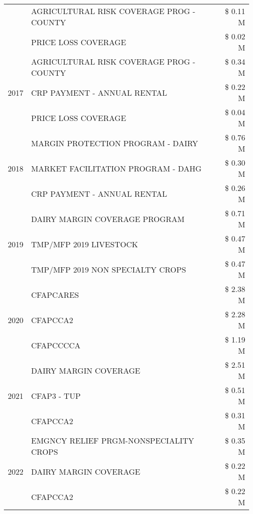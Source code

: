 \begin{tabular}{llr}
 & AGRICULTURAL RISK COVERAGE PROG - COUNTY & \$ 0.11 M \\
 & PRICE LOSS COVERAGE & \$ 0.02 M \\
\cline{1-3}
\multirow[t]{3}{*}{2017} & AGRICULTURAL RISK COVERAGE PROG - COUNTY & \$ 0.34 M \\
 & CRP PAYMENT - ANNUAL RENTAL & \$ 0.22 M \\
 & PRICE LOSS COVERAGE & \$ 0.04 M \\
\cline{1-3}
\multirow[t]{3}{*}{2018} & MARGIN PROTECTION PROGRAM - DAIRY & \$ 0.76 M \\
 & MARKET FACILITATION PROGRAM - DAHG & \$ 0.30 M \\
 & CRP PAYMENT - ANNUAL RENTAL & \$ 0.26 M \\
\cline{1-3}
\multirow[t]{3}{*}{2019} & DAIRY MARGIN COVERAGE PROGRAM & \$ 0.71 M \\
 & TMP/MFP 2019 LIVESTOCK & \$ 0.47 M \\
 & TMP/MFP 2019 NON SPECIALTY CROPS & \$ 0.47 M \\
\cline{1-3}
\multirow[t]{3}{*}{2020} & CFAPCARES & \$ 2.38 M \\
 & CFAPCCA2 & \$ 2.28 M \\
 & CFAPCCCCA & \$ 1.19 M \\
\cline{1-3}
\multirow[t]{3}{*}{2021} & DAIRY MARGIN COVERAGE & \$ 2.51 M \\
 & CFAP3 - TUP & \$ 0.51 M \\
 & CFAPCCA2 & \$ 0.31 M \\
\cline{1-3}
\multirow[t]{3}{*}{2022} & EMGNCY RELIEF PRGM-NONSPECIALITY CROPS & \$ 0.35 M \\
 & DAIRY MARGIN COVERAGE & \$ 0.22 M \\
 & CFAPCCA2 & \$ 0.22 M \\
\cline{1-3}
\bottomrule
\end{tabular}
